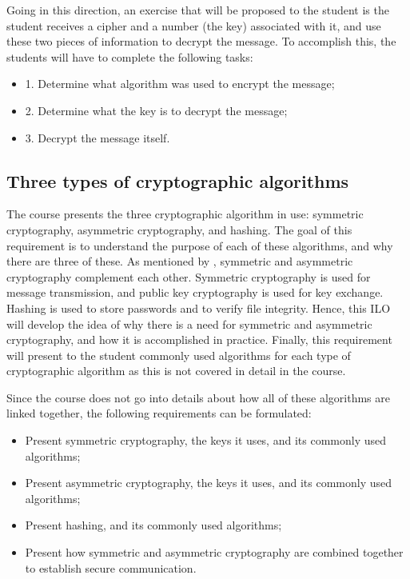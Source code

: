 \documentclass{l4proj}
\begin{document}
Going in this direction, an exercise that will be proposed to the student is
the student receives a cipher and a number (the key) associated with it, and use these two pieces of information to decrypt the message.
To accomplish this, the students will have to complete the following tasks:
\begin{itemize}
    \item 1. Determine what algorithm was used to encrypt the message;
    \item 2. Determine what the key is to decrypt the message;
    \item 3. Decrypt the message itself.
\end{itemize}

\subsection{Three types of cryptographic algorithms}

The course presents the three cryptographic algorithm in use: symmetric cryptography,
asymmetric cryptography, and hashing. 
The goal of this requirement is to understand the purpose of each of these algorithms,
and why there are three of these. As mentioned by \citet{kessler_overview_2016},
symmetric and asymmetric cryptography complement each other. 
Symmetric cryptography is used for message transmission, and public key cryptography 
is used for key exchange. Hashing is used to store passwords and to verify file integrity.
Hence, this ILO will develop the idea of why there is a need for symmetric and asymmetric
cryptography, and how it is accomplished in practice.
Finally, this requirement will present to the student commonly used algorithms for each
type of cryptographic algorithm as this is not covered in detail in the course.

Since the course does not go into details about how all of these algorithms are 
linked together, the following requirements can be formulated:
\begin{itemize}
    \item Present symmetric cryptography, the keys it uses, and its commonly used algorithms;
    \item Present asymmetric cryptography, the keys it uses, and its commonly used algorithms;
    \item Present hashing, and its commonly used algorithms;
    \item Present how symmetric and asymmetric cryptography are combined together
    to establish secure communication.
\end{itemize}
\end{document}
